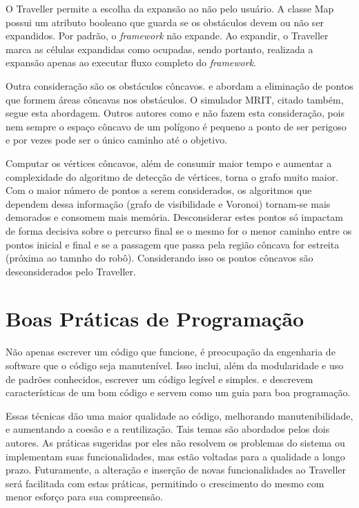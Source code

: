 O Traveller permite a escolha da expansão ao não pelo usuário. A classe Map possui um atributo booleano que guarda se os obstáculos devem ou não ser expandidos. Por padrão, o \textit{framework} não expande. Ao expandir, o Traveller marca as células expandidas como ocupadas, sendo portanto, realizada a expansão apenas ao executar fluxo completo do \textit{framework}.

Outra consideração são os obstáculos côncavos. \cite{Siegwart2004} e \cite{Guzman2008} abordam a eliminação de pontos que formem áreas côncavas nos obstáculos. O simulador MRIT, citado também, segue esta abordagem. Outros autores como \cite{Thomsen2010} e \cite{Choset2005} não fazem esta consideração, pois nem sempre o espaço côncavo de um polígono é pequeno a ponto de ser perigoso e por vezes pode ser o único caminho até o objetivo. 

Computar os vértices côncavos, além de consumir maior tempo e aumentar a complexidade do algoritmo de detecção de vértices, torna o grafo muito maior. Com o maior número de pontos a serem considerados, os algoritmos que dependem dessa informação (grafo de visibilidade e Voronoi) tornam-se mais demorados e consomem mais memória. Desconsiderar estes pontos só impactam de forma decisiva sobre o percurso final se o mesmo for o menor caminho entre os pontos inicial e final e se a passagem que passa pela região côncava for estreita (próxima ao tamnho do robô). Considerando isso os pontos côncavos são desconsiderados pelo Traveller.

\section{Boas Práticas de Programação}

Não apenas escrever um código que funcione, é preocupação da engenharia de software que o código seja manutenível. Isso inclui, além da modularidade e uso de padrões conhecidos, escrever um código legível e simples. \cite{Goodliffe2007} e \cite{McConnel2004} descrevem características de um bom código e servem como um guia para boa programação.

Essas técnicas dão uma maior qualidade ao código, melhorando manutenibilidade, e aumentando a coesão e a reutilização. Tais temas são abordados pelos dois autores. As práticas sugeridas por eles não resolvem os problemas do sistema ou implementam suas funcionalidades, mas estão voltadas para a qualidade a longo prazo. Futuramente, a alteração e inserção de novas funcionalidades ao Traveller será facilitada com estas práticas, permitindo o crescimento do mesmo com menor esforço para sua compreensão.

